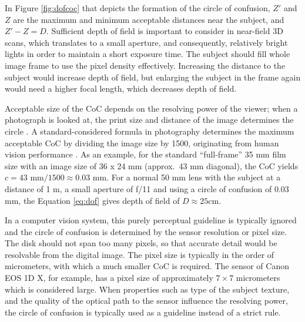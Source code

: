 In Figure \ref{fig:dofcoc} that depicts the formation of the circle of confusion, $Z'$ and $Z$ are the maximum and minimum acceptable distances near the subject, and $Z' - Z = D$.
Sufficient depth of field is important to consider in near-field 3D scans, which translates to a small aperture, and consequently, relatively bright lights in order to maintain a short exposure time.
The subject should fill whole image frame to use the pixel density effectively.
Increasing the distance to the subject would increase depth of field, but enlarging the subject in the frame again would need a higher focal length, which decreases depth of field.

Acceptable size of the CoC depends on the resolving power of the viewer; when a photograph is looked at, the print size and distance of the image determines the circle \cite{greenleaf1950photographic}.
A standard-considered formula in photography determines the maximum acceptable CoC by dividing the image size by 1500, originating from human vision performance \cite[p. 88, 92]{kingslake1992optics}.
As an example, for the standard ``full-frame'' 35 mm film size with an image size of 36 x 24 mm (approx.\ 43 mm diagonal), the CoC yields $c = 43 \text{ mm} / 1500 \approx 0.03 \text{ mm}$.
For a normal 50 mm lens with the subject at a distance of 1 m, a small aperture of f/11 and using a circle of confusion of 0.03 mm, the Equation \ref{eq:dof} gives depth of field of $D \approx 25 \text{cm}$. 

In a computer vision system, this purely perceptual guideline is typically ignored and the circle of confusion is determined by the sensor resolution or pixel size.
The disk should not span too many pixels, so that accurate detail would be resolvable from the digital image.
The pixel size is typically in the order of micrometers, with which a much smaller CoC is required.
The sensor of Canon EOS 1D X, for example, has a pixel size of approximately $7 \times 7$ micrometers \cite{eos1dx} which is considered large.
When properties such as type of the subject texture, and the quality of the optical path to the sensor influence the resolving power, the circle of confusion is typically used as a guideline instead of a strict rule.



